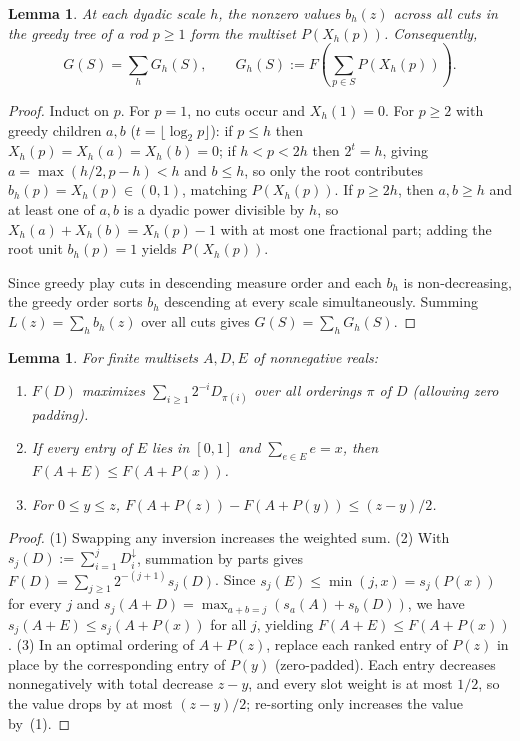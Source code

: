 \documentclass[11pt]{article}
\newtheorem{lemma}[theorem]{Lemma}
\begin{document}
\begin{lemma}\label{lem:scale}
At each dyadic scale $h$, the nonzero values $b_h(z)$ across all cuts in the greedy tree of a rod $p \ge 1$ form the multiset $P(X_h(p))$. Consequently,
\[
G(S) = \sum_h G_h(S), \qquad G_h(S) := F\!\left(\sum_{p \in S} P(X_h(p))\right).
\]
\end{lemma}

\begin{proof}
Induct on $p$. For $p = 1$, no cuts occur and $X_h(1) = 0$. For $p \ge 2$ with greedy children $a, b$ ($t = \lfloor \log_2 p \rfloor$): if $p \le h$ then $X_h(p) = X_h(a) = X_h(b) = 0$; if $h < p < 2h$ then $2^t = h$, giving $a = \max(h/2, p - h) < h$ and $b \le h$, so only the root contributes $b_h(p) = X_h(p) \in (0, 1)$, matching $P(X_h(p))$. If $p \ge 2h$, then $a, b \ge h$ and at least one of $a, b$ is a dyadic power divisible by $h$, so $X_h(a) + X_h(b) = X_h(p) - 1$ with at most one fractional part; adding the root unit $b_h(p) = 1$ yields $P(X_h(p))$.

Since greedy play cuts in descending measure order and each $b_h$ is non-decreasing, the greedy order sorts $b_h$ descending at every scale simultaneously. Summing $L(z) = \sum_h b_h(z)$ over all cuts gives $G(S) = \sum_h G_h(S)$.
\end{proof}

\begin{lemma}\label{lem:lists}
For finite multisets $A, D, E$ of nonnegative reals:
\begin{enumerate}
\item $F(D)$ maximizes $\sum_{i \ge 1} 2^{-i} D_{\pi(i)}$ over all orderings $\pi$ of $D$ (allowing zero padding).
\item If every entry of $E$ lies in $[0, 1]$ and $\sum_{e \in E} e = x$, then $F(A + E) \le F(A + P(x))$.
\item For $0 \le y \le z$, $F(A + P(z)) - F(A + P(y)) \le (z - y)/2$.
\end{enumerate}
\end{lemma}

\begin{proof}
(1) Swapping any inversion increases the weighted sum. (2) With $s_j(D) := \sum_{i=1}^j D_i^\downarrow$, summation by parts gives $F(D) = \sum_{j \ge 1} 2^{-(j+1)} s_j(D)$. Since $s_j(E) \le \min(j, x) = s_j(P(x))$ for every $j$ and $s_j(A + D) = \max_{a+b=j}(s_a(A) + s_b(D))$, we have $s_j(A + E) \le s_j(A + P(x))$ for all $j$, yielding $F(A + E) \le F(A + P(x))$. (3) In an optimal ordering of $A + P(z)$, replace each ranked entry of $P(z)$ in place by the corresponding entry of $P(y)$ (zero-padded). Each entry decreases nonnegatively with total decrease $z - y$, and every slot weight is at most $1/2$, so the value drops by at most $(z - y)/2$; re-sorting only increases the value by~(1).
\end{proof}
\end{document}
